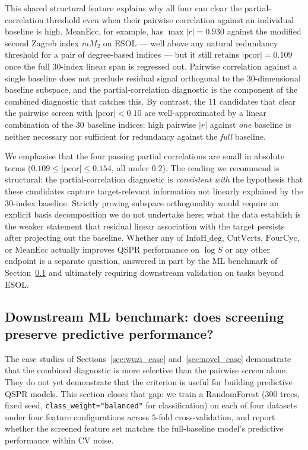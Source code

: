 \documentclass[STIX1COL]{WileyNJDv5}
\theoremstyle{definition}
\begin{document}
This shared structural feature explains why all four can clear the
partial-correlation threshold even when their pairwise correlation
against an individual baseline is high. $\mathrm{MeanEcc}$, for
example, has $\max |r| = 0.930$ against the modified second
Zagreb index $mM_2$ on ESOL --- well above any natural redundancy
threshold for a pair of degree-based indices --- but it still
retains $|\mathrm{pcor}| = 0.109$ once the full $30$-index linear
span is regressed out. Pairwise correlation against a single
baseline does not preclude residual signal orthogonal to the
$30$-dimensional baseline subspace, and the partial-correlation
diagnostic is the component of the combined diagnostic that catches
this. By contrast, the $11$ candidates that clear the pairwise
screen with $|\mathrm{pcor}| < 0.10$ are well-approximated by a
linear combination of the $30$ baseline indices: high pairwise
$|r|$ against \emph{one} baseline is neither necessary nor
sufficient for redundancy against the \emph{full} baseline.

We emphasise that the four passing partial correlations are small
in absolute terms ($0.109 \le |\mathrm{pcor}| \le 0.154$, all under
$0.2$). The reading we recommend is structural: the partial-correlation
diagnostic is \emph{consistent with} the hypothesis that these
candidates capture target-relevant information not linearly
explained by the $30$-index baseline. Strictly proving subspace
orthogonality would require an explicit basis decomposition we do
not undertake here; what the data establish is the weaker statement
that residual linear association with the target persists after
projecting out the baseline. Whether any of
$\mathrm{InfoH\_deg}$, $\mathrm{CutVerts}$, $\mathrm{FourCyc}$,
or $\mathrm{MeanEcc}$ actually improves QSPR performance on $\log S$
or any other endpoint is a separate question, answered in part by
the ML benchmark of Section~\ref{sec:ml_benchmark} and ultimately
requiring downstream validation on tasks beyond ESOL.

\subsection{Downstream ML benchmark: does screening preserve predictive performance?}\label{sec:ml_benchmark}

The case studies of Sections~\ref{sec:wuzi_case} and~\ref{sec:novel_case}
demonstrate that the combined diagnostic is more selective than the
pairwise screen alone. They do not yet demonstrate that the criterion
is useful for building predictive QSPR models. This section closes
that gap: we train a RandomForest (300 trees, fixed seed,
\texttt{class\_weight="balanced"} for classification) on each of four
datasets under four feature configurations across $5$-fold
cross-validation, and report whether the screened feature set
matches the full-baseline model's predictive performance within
CV noise.
\end{document}
